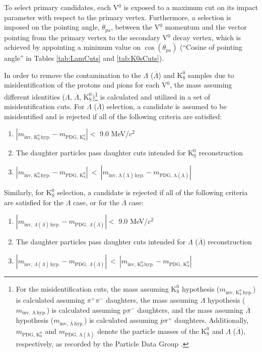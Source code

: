 \documentclass[ALICE,manyauthors]{cernphprep}
\newcommand{\Lam}{$\Lambda$\xspace}
\newcommand{\ALam}{$\overline{\Lambda}$\xspace}
\newcommand{\LamALam}{$\Lambda$ ($\overline{\Lambda}$)\xspace}
\newcommand{\Ks}{$\mathrm{K^{0}_{S}}$\xspace}
\newcommand{\Vz}{V$^{0}$\xspace}
\begin{document}
To select primary candidates, each \Vz is exposed to a maximum cut on its impact parameter with respect to the primary vertex.
Furthermore, a selection is imposed on the pointing angle, $\theta_{\mathrm{pa}}$, between the \Vz momentum and the vector pointing from the primary vertex to the secondary \Vz decay vertex, which is achieved by appointing a minimum value on $\cos(\theta_{\mathrm{pa}})$ (``Cosine of pointing angle'' in Tables \ref{tab:LamCuts} and \ref{tab:K0sCuts}).

In order to remove the contamination to the \LamALam and \Ks samples due to misidentification of the protons and pions for each \Vz, the mass assuming different identities (\Lam, \ALam, \Ks)\footnote[1]
{
For the misidentification cuts, the mass assuming \Ks hypothesis ($m_{\mathrm{inv,~ K^{0}_{S}~ hyp.}}$) is calculated assuming $\pi^{+}\pi^{-}$ daughters, the mass assuming \Lam hypothesis ($m_{\mathrm{inv,~ \Lambda~ hyp.}}$) is calculated assuming p$\pi^{-}$ daughters, and the mass assuming \ALam hypothesis ($m_{\mathrm{inv,~ \overline{\Lambda}~ hyp.}}$) is calculated assuming $\overline{p}\pi^{+}$ daughters. 
Additionally, $m_{\mathrm{PDG,\,K^{0}_{S}}}$ and $m_{\mathrm{PDG,\,\Lambda(\overline{\Lambda})}}$ denote the particle masses of the \Ks and \LamALam, respectively, as recorded by the Particle Data Group \cite{Patrignani:2016xqp}.
}
is calculated and utilized in a set of misidentification cuts.
For \LamALam selection, a candidate is assumed to be misidentified and is rejected if all of the following criteria are satisfied:

\begin{enumerate}
 \item $\left|m_{\mathrm{inv,\,K^{0}_{S}\,hyp.}} - m_{\mathrm{PDG,\,K^{0}_{S}}}\right| < $ 9.0 MeV/$c^{2}$
 \item The daughter particles pass daughter cuts intended for \Ks reconstruction
 \item $\left|m_{\mathrm{inv,\,K^{0}_{S}\,hyp.}} - m_{\mathrm{PDG,\,K^{0}_{S}}}\right|~ < ~\left|m_{\mathrm{inv,\,\Lambda(\overline{\Lambda})\,hyp.}} - m_{\mathrm{PDG,\,\Lambda(\overline{\Lambda})}}\right|$
\end{enumerate} 
Similarly, for \Ks selection, a candidate is rejected if all of the following criteria are satisfied for the \Lam case, or for the \ALam case:
\begin{enumerate}
 \item $\left|m_{\mathrm{inv},\,\Lambda(\overline{\Lambda})\,\mathrm{hyp.}} - m_{\mathrm{PDG},\,\Lambda(\overline{\Lambda})}\right| < $ 9.0 MeV/$c^{2}$
 \item The daughter particles pass daughter cuts intended for \LamALam reconstruction
 \item $\left|m_{\mathrm{inv},\,\Lambda(\overline{\Lambda})\,\mathrm{hyp.}} - m_{\mathrm{PDG},\,\Lambda(\overline{\Lambda})}\right|~ < ~\left|m_{\mathrm{inv},\,\mathrm{K}^{0}_{S}\,\mathrm{hyp.}} - m_{\mathrm{PDG},\,\mathrm{K}^{0}_{S}}\right|$
\end{enumerate} 
\end{document}
